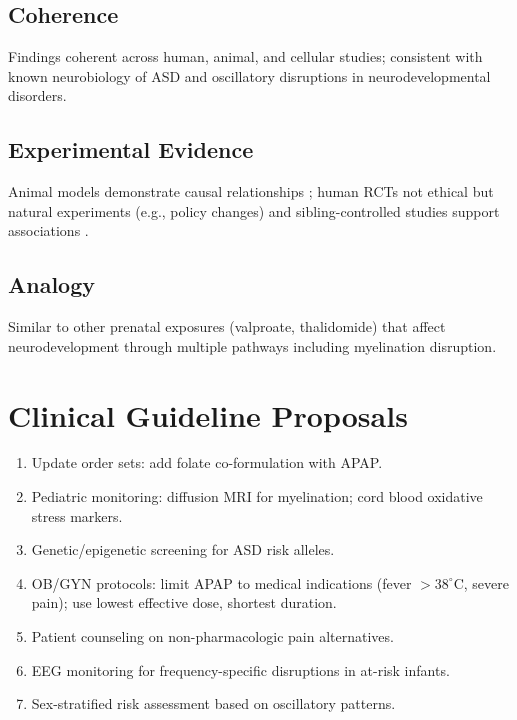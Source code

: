 \documentclass[12pt]{article}
\begin{document}
\subsection{Coherence}
Findings coherent across human, animal, and cellular studies; consistent with known neurobiology of ASD and oscillatory disruptions in neurodevelopmental disorders.

\subsection{Experimental Evidence}
Animal models demonstrate causal relationships \citep{viberg2014,philippot2022,blecharz2018}; human RCTs not ethical but natural experiments (e.g., policy changes) and sibling-controlled studies support associations \citep{brandlistuen2013,stergiakouli2016}.

\subsection{Analogy}
Similar to other prenatal exposures (valproate, thalidomide) that affect neurodevelopment through multiple pathways including myelination disruption.

\section{Clinical Guideline Proposals}
\begin{enumerate}
\item Update order sets: add folate co-formulation with APAP.
\item Pediatric monitoring: diffusion MRI for myelination; cord blood oxidative stress markers.
\item Genetic/epigenetic screening for ASD risk alleles.
\item OB/GYN protocols: limit APAP to medical indications (fever $>38^{\circ}$C, severe pain); use lowest effective dose, shortest duration.
\item Patient counseling on non-pharmacologic pain alternatives.
\item EEG monitoring for frequency-specific disruptions in at-risk infants.
\item Sex-stratified risk assessment based on oscillatory patterns.
\end{enumerate}
\end{document}
